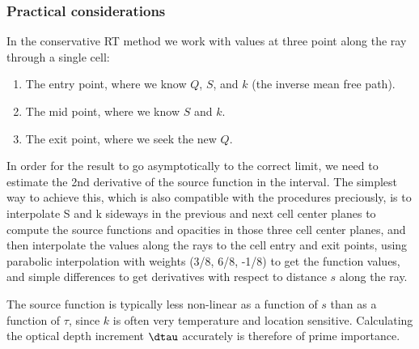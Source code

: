 \documentclass[paper=a4,fontsize=11pt]{scrartcl}
\numberwithin{equation}{section}		%
\numberwithin{figure}{section}			%
\numberwithin{table}{section}				%
\begin{document}
\subsubsection{Practical considerations}
In the conservative RT method we work with values at three point along the ray  through a single cell:
\begin{enumerate}
    \item The entry point, where we know $Q$, $S$, and $k$  (the inverse mean free path).
    \item The mid point, where we know $S$ and $k$.
    \item The exit point, where we seek the new $Q$.
\end{enumerate}
In order for the result to go asymptotically to the correct limit, we need to estimate the 2nd derivative of the source function in the interval.  The simplest way to achieve this, which is also compatible with the procedures preciously, is to interpolate S and k sideways in the previous and next cell center planes to compute the source functions and opacities in those three cell center planes, and then interpolate the values along the rays to the cell entry and exit points, using parabolic interpolation with weights (3/8, 6/8, -1/8) to get the function values, and simple differences to get derivatives with respect to distance $s$ along the ray.

The source function is typically less non-linear as a function of $s$ than as a function of $\tau$, since $k$ is often very temperature and location sensitive.  Calculating the optical depth increment $\dtau$ accurately is therefore of prime importance.
\end{document}
